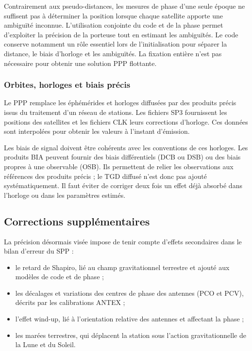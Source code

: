 Contrairement aux pseudo-distances, les mesures de phase d'une seule époque
ne suffisent pas à déterminer la position lorsque chaque satellite apporte
une ambiguïté inconnue. L'utilisation conjointe du code et de la phase permet
d'exploiter la précision de la porteuse tout en estimant les ambiguïtés.
Le code conserve notamment un rôle essentiel lors de l'initialisation pour
séparer la distance, le biais d'horloge et les ambiguïtés. La fixation entière
n'est pas nécessaire pour obtenir une solution PPP flottante.

\subsubsection{Orbites, horloges et biais précis}

Le PPP remplace les éphémérides et horloges diffusées par des produits précis
issus du traitement d'un réseau de stations. Les fichiers SP3 fournissent les
positions des satellites et les fichiers CLK leurs corrections d'horloge.
Ces données sont interpolées pour obtenir les valeurs à l'instant d'émission.

Les biais de signal doivent être cohérents avec les conventions de ces
horloges. Les produits BIA peuvent fournir des biais différentiels (DCB ou DSB)
ou des biais propres à une observable (OSB). Ils permettent de relier les
observations aux références des produits précis ; le TGD diffusé n'est donc
pas ajouté systématiquement. Il faut éviter de corriger deux fois un effet
déjà absorbé dans l'horloge ou dans les paramètres estimés.


\subsection{Corrections supplémentaires}

La précision désormais visée impose de tenir compte d'effets secondaires
dans le bilan d'erreur du SPP :
\begin{itemize}
\item le retard de Shapiro, lié au champ gravitationnel terrestre et
ajouté aux modèles de code et de phase ;
\item les décalages et variations des centres de phase des antennes (PCO et
PCV), décrits par les calibrations ANTEX ;
\item l'effet wind-up, lié à l'orientation relative
des antennes et affectant la phase ;
\item les marées terrestres, qui déplacent la station sous l'action
gravitationnelle de la Lune et du Soleil.
\end{itemize}

